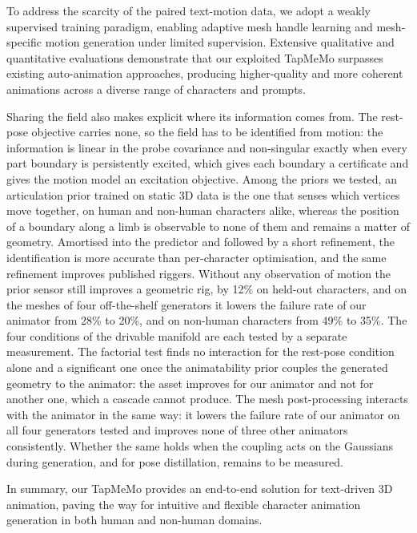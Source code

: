 \documentclass[lettersize,journal]{IEEEtran}
\newenvironment{revblock}{\par\color{red}}{\par}
\begin{document}
To address the scarcity of the paired text-motion data, we adopt a weakly supervised training paradigm, enabling adaptive mesh handle learning and mesh-specific motion generation under limited supervision. Extensive qualitative and quantitative evaluations demonstrate that our exploited TapMeMo surpasses existing auto-animation approaches, producing higher-quality and more coherent animations across a diverse range of characters and prompts.

\begin{revblock}
Sharing the field also makes explicit where its information comes from. The rest-pose objective
carries none, so the field has to be identified from motion: the information is linear in the
probe covariance and non-singular exactly when every part boundary is persistently excited,
which gives each boundary a certificate and gives the motion model an excitation objective.
Among the priors we tested, an articulation prior trained on static 3D data is the one that
senses which vertices move together, on human and non-human characters alike, whereas the
position of a boundary along a limb is observable to none of them and remains a matter of
geometry. Amortised into the predictor and followed by a short refinement, the identification is
more accurate than per-character optimisation, and the same refinement improves published
riggers. Without any observation of motion the prior sensor still improves a geometric rig, by
12\% on held-out characters, and on the meshes of four off-the-shelf generators it lowers the
failure rate of our animator from 28\% to 20\%, and on non-human characters from 49\% to 35\%. The four conditions of the drivable manifold are each tested
by a separate measurement. The factorial test finds no interaction for the rest-pose condition
alone and a significant one once the animatability prior couples the generated geometry to the
animator: the asset improves for our animator and not for another one, which a cascade cannot
produce. The mesh post-processing interacts with the animator in the same way: it lowers the
failure rate of our animator on all four generators tested and improves none of three other
animators consistently. Whether the same holds when the coupling acts on the Gaussians during generation, and
for pose distillation, remains to be measured.
\end{revblock}

In summary, our TapMeMo provides an end-to-end solution for text-driven 3D animation, paving the way for intuitive and flexible character animation generation in both human and non-human domains.
\end{document}
